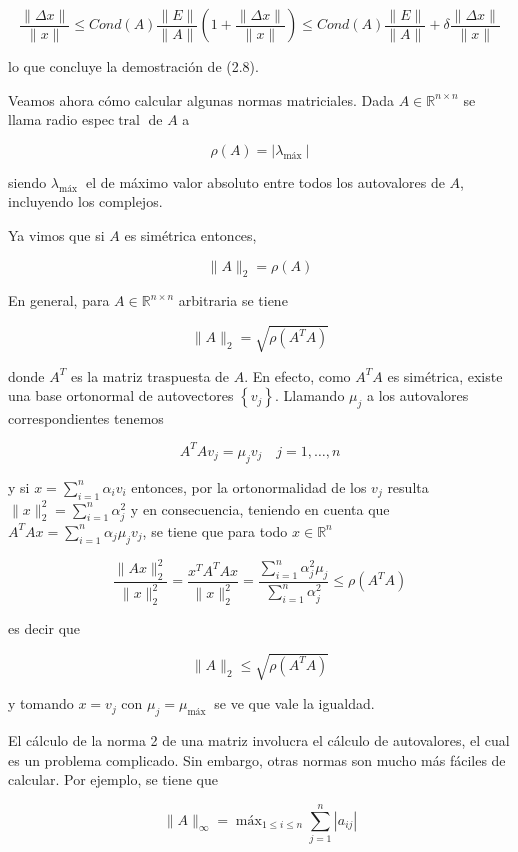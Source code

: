 \documentclass[10pt]{book}
\begin{document}
$$
\frac{\|\Delta x\|}{\|x\|} \leq C o n d(A) \frac{\|E\|}{\|A\|}\left(1+\frac{\|\Delta x\|}{\|x\|}\right) \leq C o n d(A) \frac{\|E\|}{\|A\|}+\delta \frac{\|\Delta x\|}{\|x\|}
$$

lo que concluye la demostración de (2.8).

Veamos ahora cómo calcular algunas normas matriciales. Dada $A \in \mathbb{R}^{n \times n}$ se llama radio espec$\operatorname{tral}$ de $A$ a

$$
\rho(A)=\left|\lambda_{\text {máx }}\right|
$$

siendo $\lambda_{\text {máx }}$ el de máximo valor absoluto entre todos los autovalores de $A$, incluyendo los complejos.

Ya vimos que si $A$ es simétrica entonces,

$$
\|A\|_{2}=\rho(A)
$$

En general, para $A \in \mathbb{R}^{n \times n}$ arbitraria se tiene

$$
\|A\|_{2}=\sqrt{\rho\left(A^{T} A\right)}
$$

donde $A^{T}$ es la matriz traspuesta de $A$. En efecto, como $A^{T} A$ es simétrica, existe una base ortonormal de autovectores $\left\{v_{j}\right\}$. Llamando $\mu_{j}$ a los autovalores correspondientes tenemos

$$
A^{T} A v_{j}=\mu_{j} v_{j} \quad j=1, \ldots, n
$$

y si $x=\sum_{i=1}^{n} \alpha_{i} v_{i}$ entonces, por la ortonormalidad de los $v_{j}$ resulta $\|x\|_{2}^{2}=\sum_{i=1}^{n} \alpha_{j}^{2}$ y en consecuencia, teniendo en cuenta que $A^{T} A x=\sum_{i=1}^{n} \alpha_{j} \mu_{j} v_{j}$, se tiene que para todo $x \in \mathbb{R}^{n}$

$$
\frac{\|A x\|_{2}^{2}}{\|x\|_{2}^{2}}=\frac{x^{T} A^{T} A x}{\|x\|_{2}^{2}}=\frac{\sum_{i=1}^{n} \alpha_{j}^{2} \mu_{j}}{\sum_{i=1}^{n} \alpha_{j}^{2}} \leq \rho\left(A^{T} A\right)
$$

es decir que

$$
\|A\|_{2} \leq \sqrt{\rho\left(A^{T} A\right)}
$$

y tomando $x=v_{j}$ con $\mu_{j}=\mu_{\text {máx }}$ se ve que vale la igualdad.

El cálculo de la norma 2 de una matriz involucra el cálculo de autovalores, el cual es un problema complicado. Sin embargo, otras normas son mucho más fáciles de calcular. Por ejemplo, se tiene que

$$
\|A\|_{\infty}=\operatorname{máx}_{1 \leq i \leq n} \sum_{j=1}^{n}\left|a_{i j}\right|
$$
\end{document}
